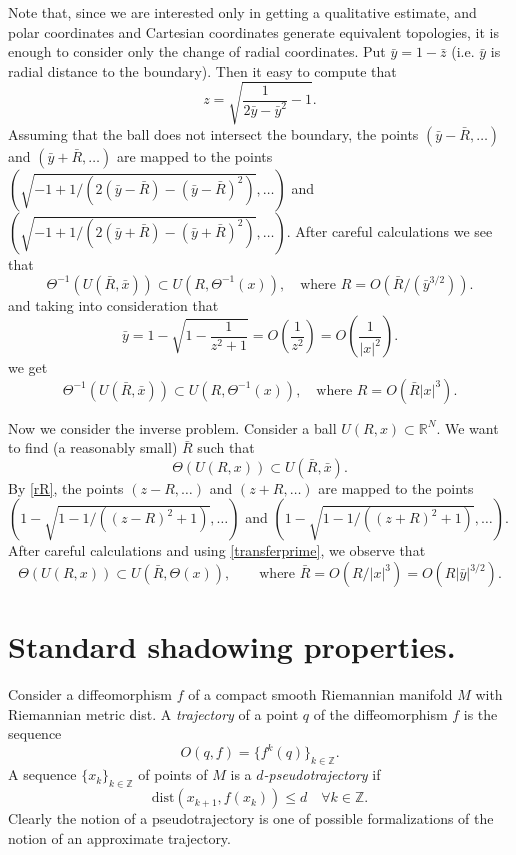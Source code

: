 \documentclass[11pt]{article}
\theoremstyle{Mystyle}
\begin{document}
Note that, since we are interested only in getting a qualitative estimate, and polar coordinates and Cartesian coordinates generate equivalent topologies, it is enough to consider only the change of radial coordinates.
Put $\bar{y} = 1-\bar{z}$ (i.e. $\bar{y}$ is radial distance to the boundary). Then it easy to compute that
$$z = \sqrt{\frac{1}{2\bar{y} - \bar{y}^2} - 1}.$$
 Assuming that the ball does not intersect the boundary, the points $(\bar{y}-\bar{R},\ldots)$ and $(\bar{y} + \bar{R},\ldots)$ are mapped to the points
$(\sqrt{-1 + 1/(2(\bar{y}-\bar{R}) - (\bar{y}-\bar{R})^2)},\ldots)$ and $(\sqrt{-1 + 1/(2(\bar{y}+\bar{R}) - (\bar{y}+\bar{R})^2)},\ldots)$. After careful  calculations we see that
$$
\Theta^{-1}(U(\bar{R},\bar{x})) \subset U(R,\Theta^{-1}(x)),\quad
\mbox{where }R = O(\bar{R}/(\bar{y}^{3/2})).
$$
and taking into consideration that
\begin{equation}
\label{transferprime} 
\bar{y} = 1 - \sqrt{1 - \frac{1}{z^2 + 1}} = O\left(\frac{1}{z^2}\right) = O\left(\frac{1}{|x|^2}\right).
\end{equation}
we get
\begin{equation}
\label{transfer}
\Theta^{-1}(U(\bar{R},\bar{x})) \subset U(R,\Theta^{-1}(x)),\quad
\mbox{where }R = O(\bar{R}|x|^{3}).
\end{equation}

Now we consider the inverse problem. Consider a ball $U(R,x)\subset\mathbb{R}^N$. We want to find (a reasonably small) $\bar{R}$ such that
$$\Theta(U(R,x))\subset U(\bar{R},\bar{x}).$$
By \eqref{rR}, the points $(z-R,\ldots)$ and $(z+R,\ldots)$ are mapped to the points
$(1-\sqrt{1 - 1/((z-R)^2 + 1)},\ldots)$ and $(1-\sqrt{1-1/((z+R)^2+1)},\ldots)$. After careful calculations and using \eqref{transferprime}, we observe that
\begin{equation}
\label{transferalt}
\Theta(U(R,x))\subset U(\bar{R},\Theta(x)),\qquad\mbox{where }\bar{R}=O(R/|x|^3)=O(R|\bar{y}|^{3/2}).
\end{equation}


\section{Standard shadowing properties.}

Consider a diffeomorphism $f$ of a compact smooth Riemannian manifold $M$ with Riemannian metric dist. A \textit{trajectory} of a point $q$ of the diffeomorphism $f$ is the sequence 
$$O(q,f) = \{f^k(q)\}_{k\in\mathbb{Z}}.$$
A sequence $\{x_k\}_{k\in\mathbb{Z}}$ of points of $M$ is a $d$\textit{-pseudotrajectory} if
\begin{equation}
\label{pseudo}
\mbox{dist}(x_{k+1},f(x_k))\leq d\quad\forall k\in\mathbb{Z}.
\end{equation}
Clearly the notion of a pseudotrajectory is one of possible formalizations of the notion of an approximate trajectory.
\end{document}
